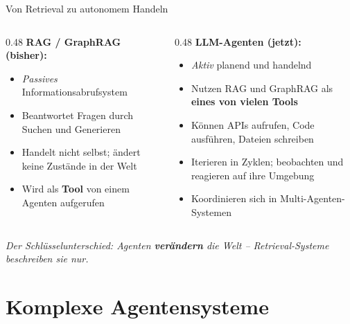 \documentclass[aspectratio=1610, xcolor=dvipsnames, 9pt]{beamer}
\begin{document}
\begin{frame}{Von Retrieval zu autonomem Handeln}
  \begin{columns}
    \begin{column}{0.48\textwidth}
      \textbf{RAG / GraphRAG (bisher):}
      \begin{itemize}
        \item \emph{Passives} Informationsabrufsystem
        \item Beantwortet Fragen durch Suchen und Generieren
        \item Handelt nicht selbst; ändert keine Zustände in der Welt
        \item Wird als \textbf{Tool} von einem Agenten aufgerufen
      \end{itemize}
    \end{column}
    \begin{column}{0.48\textwidth}
      \textbf{LLM-Agenten (jetzt):}
      \begin{itemize}
        \item \emph{Aktiv} planend und handelnd
        \item Nutzen RAG und GraphRAG als \textbf{eines von vielen Tools}
        \item Können APIs aufrufen, Code ausführen, Dateien schreiben
        \item Iterieren in Zyklen; beobachten und reagieren auf ihre Umgebung
        \item Koordinieren sich in Multi-Agenten-Systemen
      \end{itemize}
    \end{column}
  \end{columns}
  \vspace{0.4cm}
  \begin{center}
    \textit{Der Schlüsselunterschied: Agenten \textbf{verändern} die Welt -- Retrieval-Systeme beschreiben sie nur.}
  \end{center}
\end{frame}

\section{Komplexe Agentensysteme}
\end{document}
